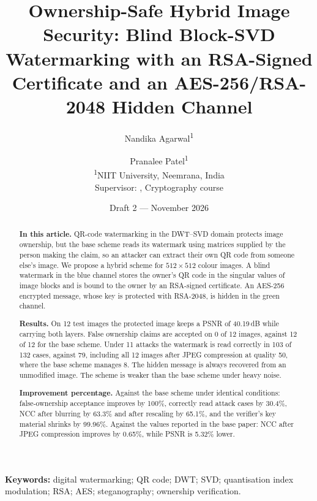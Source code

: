 \documentclass[11pt,a4paper]{article}
\title{Ownership-Safe Hybrid Image Security: Blind Block-SVD Watermarking with an RSA-Signed Certificate and an AES-256/RSA-2048 Hidden Channel}
\author{Nandika Agarwal\textsuperscript{1} \and Pranalee Patel\textsuperscript{1}\\[4pt]
\small\textsuperscript{1}NIIT University, Neemrana, India\\
\small Supervisor: \todo{Professor's name}, Cryptography course\\
\small\texttt{\todo{email addresses}}}
\date{Draft 2 --- November 2026}
\begin{document}
\maketitle

\begin{abstract}
\sloppy\noindent\textbf{In this article.}
QR-code watermarking in the DWT--SVD domain protects image ownership, but the base scheme reads its watermark using matrices supplied by the person making the claim, so an attacker can extract their own QR code from someone else's image. We propose a hybrid scheme for $512\times512$ colour images. A blind watermark in the blue channel stores the owner's QR code in the singular values of image blocks and is bound to the owner by an RSA-signed certificate. An AES-256 encrypted message, whose key is protected with RSA-2048, is hidden in the green channel.

\smallskip\noindent\textbf{Results.}
On 12 test images the protected image keeps a PSNR of 40.19\,dB while carrying both layers. False ownership claims are accepted on 0 of 12 images, against 12 of 12 for the base scheme. Under 11 attacks the watermark is read correctly in 103 of 132 cases, against 79, including all 12 images after JPEG compression at quality 50, where the base scheme manages 8. The hidden message is always recovered from an unmodified image. The scheme is weaker than the base scheme under heavy noise.

\smallskip\noindent\textbf{Improvement percentage.}
Against the base scheme under identical conditions: false-ownership acceptance improves by 100\%, correctly read attack cases by 30.4\%, NCC after blurring by 63.3\% and after rescaling by 65.1\%, and the verifier's key material shrinks by 99.96\%. Against the values reported in the base paper: NCC after JPEG compression improves by 0.65\%, while PSNR is 5.32\% lower.
\end{abstract}

\smallskip\noindent\textbf{Keywords:} digital watermarking; QR code; DWT; SVD; quantisation index modulation; RSA; AES; steganography; ownership verification.

\end{document}

